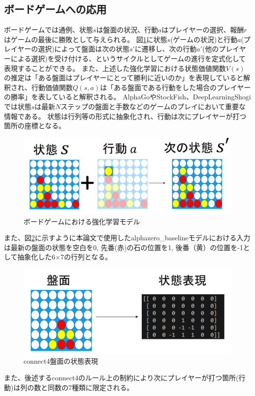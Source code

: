 \subsection{ボードゲームへの応用}
ボードゲームでは通例、状態$s$は盤面の状況、行動$a$はプレイヤーの選択、報酬$r$はゲームの最後に勝敗として与えられる。
図\ref{fig:board-game-model}に状態$s$(ゲームの状況)と行動$a$(プレイヤーの選択)によって盤面は次の状態$s'$に遷移し、次の行動$a'$(他のプレイヤーによる選択)を受け付ける、というサイクルとしてゲームの進行を定式化して表現することができる。
また、上述した強化学習における状態価値関数$V(s)$の推定は「ある盤面はプレイヤーにとって勝利に近いのか」を表現していると解釈され、行動価値関数$Q(s, a)$は「ある盤面である行動をした場合のプレイヤーの勝率」を表していると解釈される。
AlphaGo\cite{AlphaGo}やStockFish\cite{StockFish}、DeepLearningShogi\cite{dlshogi}では状態$s$は最新$N$ステップの盤面と手数などのゲームのプレイにおいて重要な情報である。
状態は行列等の形式に抽象化され、行動は次にプレイヤーが打つ箇所の座標となる。
\begin{figure}[t]
	\includegraphics[trim={0cm 0cm 0cm 0cm},clip]{./figure/transition.png}
	\caption{ボードゲームにおける強化学習モデル}
	\label{fig:board-game-model}
\end{figure}

また、図\ref{fig:connect4-symbol}に示すように本論文で使用したalphazero\_baselineモデル\cite{baseline}における入力は最新の盤面の状態を空白を0, 先番(赤)の石の位置を1, 後番（黄）の位置を-1として抽象化した6$\times$7の行列となる。
\begin{figure}[t]
	\centering
	\includegraphics[width=\linewidth]{./figure/symbolic.png}
	\caption{connect4盤面の状態表現}
	\label{fig:connect4-symbol}
\end{figure}
また、後述するconnect4のルール上の制約により次にプレイヤーが打つ箇所(行動)は列の数と同数の7種類に限定される。

